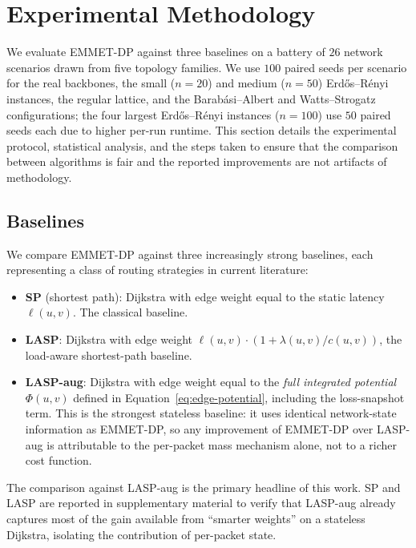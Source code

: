 
\section{Experimental Methodology}
\label{sec:experiments}

We evaluate EMMET-DP against three baselines on a battery of $26$
network scenarios drawn from five topology families. We use
$100$ paired seeds per scenario for the real backbones, the
small ($n=20$) and medium ($n=50$) Erd\H{o}s--R\'enyi instances,
the regular lattice, and the Barab\'asi--Albert and Watts--Strogatz
configurations; the four largest Erd\H{o}s--R\'enyi instances
($n=100$) use $50$ paired seeds each due to higher per-run
runtime. This section details the
experimental protocol, statistical analysis, and the steps taken to
ensure that the comparison between algorithms is fair and the
reported improvements are not artifacts of methodology.

\subsection{Baselines}
\label{subsec:baselines}

We compare EMMET-DP against three increasingly strong baselines, each
representing a class of routing strategies in current literature:

\begin{itemize}
\item \textbf{SP} (shortest path): Dijkstra with edge weight equal to
the static latency $\ell(u,v)$. The classical baseline.
\item \textbf{LASP}: Dijkstra with edge weight
$\ell(u,v)\cdot(1 + \lambda(u,v)/c(u,v))$, the load-aware
shortest-path baseline.
\item \textbf{LASP-aug}: Dijkstra with edge weight equal to the
\emph{full integrated potential} $\Phi(u,v)$ defined in
Equation~\ref{eq:edge-potential}, including the loss-snapshot term.
This is the strongest stateless baseline: it uses identical
network-state information as EMMET-DP, so any improvement of
EMMET-DP over LASP-aug is attributable to the per-packet mass
mechanism alone, not to a richer cost function.
\end{itemize}

The comparison against LASP-aug is the primary headline of this work.
SP and LASP are reported in supplementary material to verify that
LASP-aug already captures most of the gain available from
``smarter weights'' on a stateless Dijkstra, isolating the
contribution of per-packet state.

